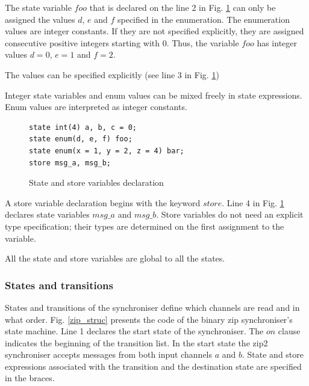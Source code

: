 The state variable $foo$ that is declared on the line 2 in Fig. \ref{sync_statevar} can only be assigned the values $d$, $e$ and $f$ specified in the enumeration. The enumeration values are integer constants. If they are not specified explicitly, they are assigned consecutive positive integers starting with 0.
Thus, the variable $foo$ has integer values $d=0$, $e=1$ and $f=2$. %


The values can be specified explicitly (see line 3 in Fig. \ref{sync_statevar})

Integer state variables and enum values can be mixed freely in state expressions. Enum values are interpreted as integer constants.%

\begin{figure}[h!]
\lstset{numbers=left, numberstyle=\small, stepnumber=1, numbersep=8pt}
\begin{lstlisting}[frame=single]
state int(4) a, b, c = 0;
state enum(d, e, f) foo;
state enum(x = 1, y = 2, z = 4) bar;
store msg_a, msg_b;
\end{lstlisting}
\caption{State and store variables declaration}
\label{sync_statevar}
\end{figure}

A store variable declaration begins with the keyword $store$. Line 4 in Fig. \ref{sync_statevar} declares state variables $msg\_a$ and $msg\_b$. Store variables do not need an explicit type specification; their types are determined on the first assignment to the variable.

All the state and store variables are global to all the states.


  \subsubsection*{States and transitions}
States and transitions of the synchroniser define which channels are read and in what order. Fig. \ref{zip_struc} presents the code of the binary zip synchroniser's state machine. Line 1 declares the start state of the synchroniser. The $on$ clause indicates the beginning of the transition list. In the start state the zip2 synchroniser accepts messages from both input channels $a$ and $b$. State and store expressions associated with the transition and the destination state are specified in the braces.

